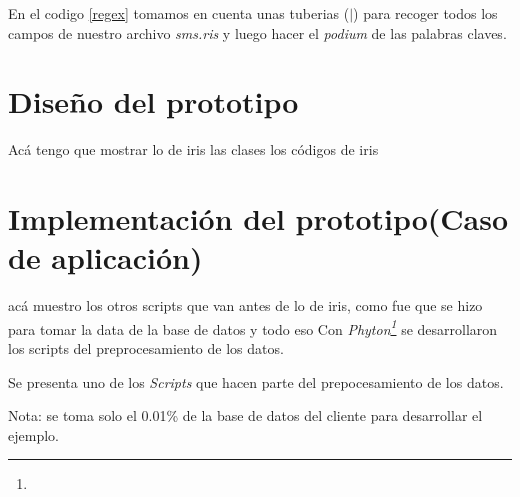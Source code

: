    En el codigo \ref{regex} tomamos en cuenta unas tuberias ($\mid$) para recoger todos los campos de nuestro archivo \textit{sms.ris} y luego hacer el \textit{podium} de las palabras claves.
  
  \section{Diseño del prototipo}
  Acá tengo que mostrar lo de iris las clases los códigos de iris
 


  \section{Implementación del prototipo(Caso de aplicación)}
  acá muestro los otros scripts que van antes de lo de iris, como fue que se hizo para tomar la data de la base de datos y todo eso
  Con \textit{Phyton\footnote{  }} se desarrollaron los scripts del preprocesamiento de los datos.
  
  
  
  
  
  Se presenta uno de los \textit{Scripts} que hacen parte del prepocesamiento de los datos.
  
 
  
  
 


Nota: se toma solo el 0.01\% de la base de datos del cliente para desarrollar el ejemplo. 
